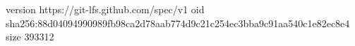 version https://git-lfs.github.com/spec/v1
oid sha256:88d04094990989fb98ca2d78aab774d9c21c254ec3bba9c91aa540c1e82ec8e4
size 393312
